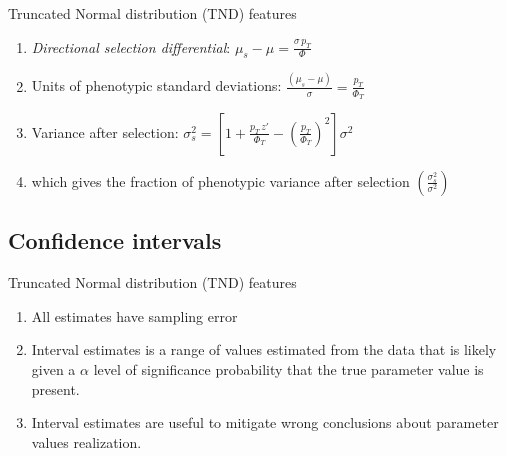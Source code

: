 \documentclass{beamer}
\begin{document}
\begin{frame}{Truncated Normal distribution (TND) features}
  \begin{enumerate}
  
  \item<1-> \textit{Directional selection differential}: $\mu_{s} - \mu = \frac{\sigma \, p_{T}}{\Phi}$ 
  \vspace{0.2cm}
    
  \item<2-> Units of phenotypic standard deviations: $\frac{(\mu_{s}-\mu)}{\sigma} = \frac{p_{T}}{\Phi_{T}}$
  \vspace{0.2cm}
  
  \item<3-> Variance after selection: $\sigma_{s}^2 = \left[1 + \frac{p_{T} \, z'}{\Phi_{T}} - \left(\frac{p_{T}}{\Phi_{T}} \right)^2 \right]\sigma^2$
  \vspace{0.2cm}
  
  \item<4-> which gives the fraction of phenotypic variance after selection $\left(\frac{\sigma_{s}^2}{\sigma^2} \right)$ 
  \vspace{0.2cm}
             
  \end{enumerate}
    
\end{frame}


\subsection{Confidence intervals}
\begin{frame}{Truncated Normal distribution (TND) features}
  \begin{enumerate}
  
  \item<1-> All estimates have sampling error
  \vspace{0.2cm}
    
  \item<2-> Interval estimates is a range of values estimated from the data that is likely given a $\alpha$ level of significance probability that the true parameter value is present.
  \vspace{0.2cm}
  
  \item<3-> Interval estimates are useful to mitigate wrong conclusions about parameter values realization.  
  \vspace{0.2cm}
             
  \end{enumerate}
    
\end{frame}
\end{document}

